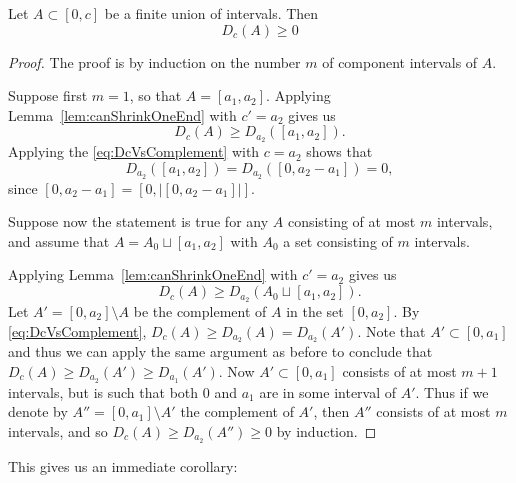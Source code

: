 \begin{lemma} \label{lem:FBIIntervalsUnionUCoords}
    Let $A\subset[0,c]$ be a finite union of intervals. Then
    \[
    D_c(A)\geq 0
    \]
\end{lemma}

\begin{proof}
    The proof is by induction on the number $m$ of component intervals of $A$.  

    Suppose first $m=1$, so that $A = [a_1,a_2]$.  Applying Lemma~\ref{lem:canShrinkOneEnd} with $c'=a_2$ gives us $$D_{c}(A) \geq D_{a_2}([a_1,a_2]).$$  Applying the \eqref{eq:DcVsComplement} with $c=a_2$ shows that 
    $$D_{a_2}([a_1,a_2])=D_{a_2}([0,a_2-a_1])=0,$$ since $[0,a_2-a_1] = [0,|[0,a_2-a_1]|]$.  

    Suppose now the statement is true for any $A$ consisting of at most $m$ intervals, and assume that $A=A_0 \sqcup [a_1,a_2]$ with $A_0$ a set consisting of $m$ intervals. 
    
    Applying  Lemma~\ref{lem:canShrinkOneEnd} with $c'=a_2$ gives us $$D_{c}(A) \geq D_{a_2}(A_0 \sqcup [a_1,a_2]).$$ 
    Let $A' = [0,a_2]\setminus A$ be the complement of $A$ in the set $[0,a_2]$. By \eqref{eq:DcVsComplement}, $D_c(A) \geq D_{a_2}(A) = D_{a_2}(A')$.
    Note that $A'\subset [0,a_1]$ and thus we can apply the same argument as before to conclude that $D_{c} (A)\geq D_{a_2}(A')\geq D_{a_1}(A')$.  Now $A'\subset[0,a_1]$ consists of at most $m+1$ intervals, but is such that both $0$ and $a_1$ are in some interval of $A'$.  Thus if we denote by $A''=[0,a_1]\setminus A'$ the complement of $A'$, then $A''$ consists of at most $m$ intervals, and so $D_{c} (A) \geq D_{a_2}(A'')\geq 0$ by induction. 
\end{proof}


This gives us an immediate corollary: 

